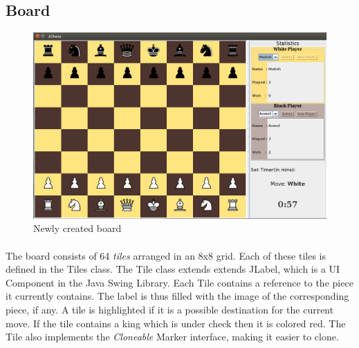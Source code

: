 \subsection{Board}
\begin{figure}[htb]
\centering
\includegraphics[scale=0.3]{SS-StartBoard.png} %
\caption{Newly created board}
\label{fig:label} %
\end{figure}
\paragraph{}
The board consists of 64 \textit{tiles} arranged in an 8x8 grid. Each of these tiles is defined in the Tiles class. The Tile class extends extends JLabel, which is a UI Component in the Java Swing Library. Each Tile contains a reference to the piece it currently contains. The label is thus filled with the image of the corresponding piece, if any. A tile is highlighted if it is a possible destination for the current move. If the tile contains a king which is under check then it is colored red. The Tile also implements the \textit{Cloneable} Marker interface, making it easier to clone.

